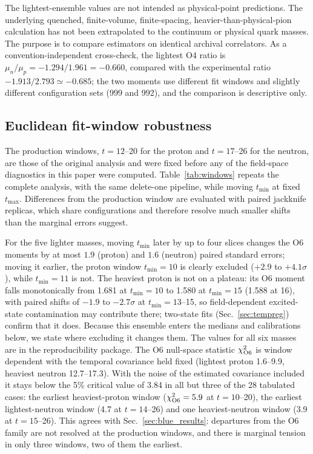 \documentclass[aps,prd,preprint,nofootinbib,floatfix]{revtex4-2}
\begin{document}
The lightest-ensemble values are not intended as physical-point predictions. The underlying quenched, finite-volume, finite-spacing, heavier-than-physical-pion calculation has not been extrapolated to the continuum or physical quark masses. The purpose is to compare estimators on identical archival correlators. As a convention-independent cross-check, the lightest O4 ratio is $\mu_n/\mu_p=-1.294/1.961=-0.660$, compared with the experimental ratio $-1.913/2.793\simeq-0.685$; the two moments use different fit windows and slightly different configuration sets (999 and 992), and the comparison is descriptive only.


\subsection{Euclidean fit-window robustness}
\label{sec:windows}

The production windows, $t=12$--20 for the proton and $t=17$--26 for the neutron, are those of the original analysis and were fixed before any of the field-space diagnostics in this paper were computed. Table~\ref{tab:windows} repeats the complete analysis, with the same delete-one pipeline, while moving $t_{\min}$ at fixed $t_{\max}$. Differences from the production window are evaluated with paired jackknife replicas, which share configurations and therefore resolve much smaller shifts than the marginal errors suggest.

For the five lighter masses, moving $t_{\min}$ later by up to four slices changes the O6 moments by at most $1.9$ (proton) and $1.6$ (neutron) paired standard errors; moving it earlier, the proton window $t_{\min}=10$ is clearly excluded ($+2.9$ to $+4.1\sigma$), while $t_{\min}=11$ is not. The heaviest proton is not on a plateau: its O6 moment falls monotonically from 1.681 at $t_{\min}=10$ to 1.580 at $t_{\min}=15$ (1.588 at 16), with paired shifts of $-1.9$ to $-2.7\sigma$ at $t_{\min}=13$--15, so field-dependent excited-state contamination may contribute there; two-state fits (Sec.~\ref{sec:tempreg}) confirm that it does. Because this ensemble enters the medians and calibrations below, we state where excluding it changes them. The values for all six masses are in the reproducibility package. The O6 null-space statistic $\chi^2_{\rm O6}$ is window dependent with the temporal covariance held fixed (lightest proton 1.6--9.9, heaviest neutron 12.7--17.3). With the noise of the estimated covariance included it stays below the 5\% critical value of 3.84 in all but three of the 28 tabulated cases: the earliest heaviest-proton window ($\chi^2_{\rm O6}=5.9$ at $t=10$--20), the earliest lightest-neutron window (4.7 at $t=14$--26) and one heaviest-neutron window (3.9 at $t=15$--26). This agrees with Sec.~\ref{sec:blue_results}: departures from the O6 family are not resolved at the production windows, and there is marginal tension in only three windows, two of them the earliest.
\end{document}
